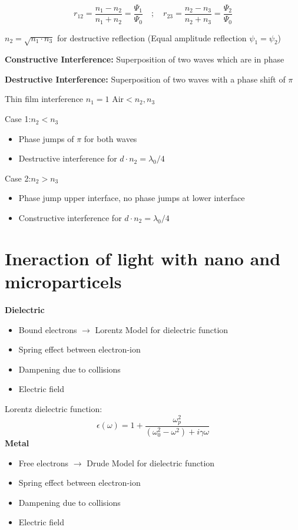\[
r_{12} = \frac{n_1 - n_2}{n_1 + n_2} = \frac{\Psi_1}{\Psi_0} \quad ; \quad
r_{23} = \frac{n_2 - n_3}{n_2 + n_3} = \frac{\Psi_2}{\Psi_0}
\]

\(n_2 = \sqrt{n_1 \cdot n_3}\) for destructive reflection (Equal amplitude reflection \(\psi_1 = \psi_2\))

\textbf{Constructive Interference:} Superposition of two waves which are in phase

\textbf{Destructive Interference:} Superposition of two waves with a phase shift of \(\pi\)

Thin film interference \(n_1 = 1 \text{ Air} < n_2, n_3\)

Case 1:\(n_2 < n_3\)
\begin{itemize}
    \item Phase jumps of \(\pi\) for both waves
    \item Destructive interference for \(d \cdot n_2 = \lambda_0/4\)
\end{itemize}
Case 2:\(n_2 > n_3\)
\begin{itemize}
    \item Phase jump upper interface, no phase jumps at lower interface
    \item Constructive interference for \(d\cdot n_2 = \lambda_0/4\)
\end{itemize}

\section{Ineraction of light with nano and microparticels}
\textbf{Dielectric}
\begin{itemize}
    \item Bound electrons \(\rightarrow\) Lorentz Model for dielectric function
    \item Spring effect between electron-ion
    \item Dampening due to collisions
    \item Electric field
\end{itemize}

Lorentz dielectric function:
\[
\epsilon(\omega) = 1 + \frac{\omega^2_p}{(\omega_0^2-\omega^2)+i\gamma \omega}
\]
\textbf{Metal}
\begin{itemize}
    \item Free electrons \(\rightarrow\) Drude Model for dielectric function
    \item Spring effect between electron-ion
    \item Dampening due to collisions
    \item Electric field
\end{itemize}

